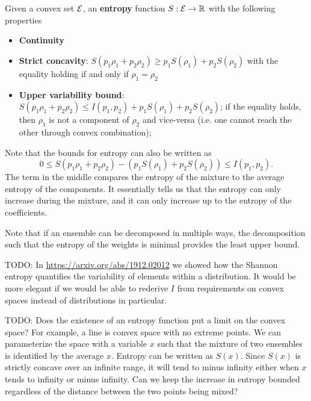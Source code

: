 \begin{ext}
	Given a convex set $\mathcal{E}$, an \textbf{entropy} function $S : \mathcal{E} \to \mathbb{R}$ with the following properties
	\begin{itemize}
		\item \textbf{Continuity}
		\item \textbf{Strict concavity}: $S(p_1\rho_1 + p_2 \rho_2) \geq p_1 S(\rho_1) + p_2 S(\rho_2)$ with the equality holding if and only if $\rho_1 = \rho_2$
		\item \textbf{Upper variability bound}: $S(p_1\rho_1 + p_2 \rho_2) \leq I(p_1, p_2) + p_1 S(\rho_1) + p_2 S(\rho_2)$; if the equality holds, then $\rho_1$ is not a component of $\rho_2$ and vice-versa (i.e. one cannot reach the other through convex combination); 
	\end{itemize}
\end{ext}

\begin{remark}
	Note that the bounds for entropy can also be written as
	$$ 0 \leq S(p_1\rho_1 + p_2 \rho_2) - (p_1 S(\rho_1) + p_2 S(\rho_2)) \leq I(p_1, p_2).$$
	The term in the middle compares the entropy of the mixture to the average entropy of the components. It essentially tells us that the entropy can only increase during the mixture, and it can only increase up to the entropy of the coefficients.
	
	Note that if an ensemble can be decomposed in multiple ways, the decomposition such that the entropy of the weights is minimal provides the least upper bound.
	
	TODO: In \url{https://arxiv.org/abs/1912.02012} we showed how the Shannon entropy quantifies the variability of elements within a distribution. It would be more elegant if we would be able to rederive $I$ from requirements on convex spaces instead of distributions in particular.
	
	TODO: Does the existence of an entropy function put a limit on the convex space? For example, a line is convex space with no extreme points. We can parameterize the space with a variable $x$ such that the mixture of two ensembles is identified by the average $x$. Entropy can be written as $S(x)$. Since $S(x)$ is strictly concave over an infinite range, it will tend to minus infinity either when $x$ tends to infinity or minus infinity. Can we keep the increase in entropy bounded regardless of the distance between the two points being mixed? 
\end{remark}

